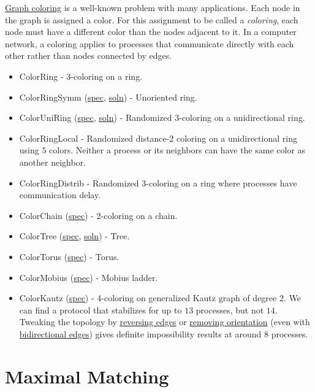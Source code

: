 \href{http://en.wikipedia.org/wiki/Graph_coloring}{Graph coloring} is a well-known problem with many applications.
Each node in the graph is assigned a color.
For this assignment to be called a \textit{coloring}, each node must have a different color than the nodes adjacent to it.
In a computer network, a coloring applies to processes that communicate directly with each other rather than nodes connected by edges.
\begin{itemize}
\item ColorRing \href{example/Coloring.html#sec:ColorRing}{\LinkText}
- 3-coloring on a ring.
\item ColorRingSymm (\href{\examplespec/ColorRingSymm.prot}{spec}, \href{\examplesoln/ColorRingSymm.prot}{soln})
- Unoriented ring.
\item ColorUniRing (\href{\examplespec/ColorUniRing.prot}{spec}, \href{\examplesoln/ColorUniRing.prot}{soln})
- Randomized 3-coloring on a unidirectional ring.
\item ColorRingLocal \href{example/Coloring.html#sec:ColorRingLocal}{\LinkText}
- Randomized distance-2 coloring on a unidirectional ring using $5$ colors.
Neither a process or its neighbors can have the same color as another neighbor.
\item ColorRingDistrib \href{example/Coloring.html#sec:ColorRingDistrib}{\LinkText}
- Randomized 3-coloring on a ring where processes have communication delay.
\item ColorChain (\href{\examplespec/ColorChain.prot}{spec})
- 2-coloring on a chain.
\item ColorTree (\href{\examplespec/ColorTree.prot}{spec}, \href{\examplesoln/ColorTree.prot}{soln})
- Tree.
\item ColorTorus (\href{\examplespec/ColorTorus.prot}{spec})
- Torus.
\item ColorMobius (\href{\examplespec/ColorMobius.prot}{spec})
- Mobius ladder.
\item ColorKautz (\href{\examplespec/ColorKautz.prot}{spec})
- 4-coloring on generalized Kautz graph of degree 2.
We can find a protocol that stabilizes for up to $13$ processes, but not $14$.
Tweaking the topology by
\href{\examplespec/ColorKautzReverse.prot}{reversing edges}
or
\href{\examplespec/ColorKautzSymm.prot}{removing orientation}
(even with \href{\examplespec/ColorKautzBi.prot}{bidirectional edges})
gives definite impossibility results at around $8$ processes.
\end{itemize}

\section{Maximal Matching}

